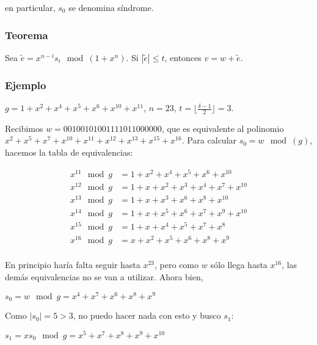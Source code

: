 \documentclass[10pt,a4paper]{article}
\begin{document}
en particular, $s_0$ se denomina síndrome.

\subsubsection*{Teorema}

Sea $\tilde{e} = x^{n-i}s_i \mod (1+x^n)$. Si $|\tilde{e}|\leq t$, entonces $v = w+ \tilde{e}$.

\subsubsection*{Ejemplo}

$g = 1 + x^2 + x^4 + x^5 + x^6 + x^{10} + x^{11}$, $n = 23$, $t = \lfloor \frac{\delta - 1}{2} \rfloor= 3$.

Recibimos $w = 0 0 1 0 0 1 0 1 0 0 1 1 1 1 0 1 1 0 0 0 0 0 0$, que es equivalente al polinomio $x^2+x^5+x^7+x^{10}+x^{11}+x^{12} + x^{13} + x^{15} + x^{16}$. Para calcular $s_0 = w \mod (g)$, hacemos la tabla de equivalencias:

\begin{center}
\begin{align*} x^{11} \mod g &= 1 + x^2 + x^4 + x^5 + x^6 + x^{10}\\ x^{12} \mod g &= 1+x+x^2+x^3+x^4+x^7+x^{10}\\ x^{13} \mod g &= 1 + x + x^3 + x^6 +x^{8}+x^{10}\\ x^{14} \mod g &= 1 + x +x^{5}+x^{ 6}+x^{ 7}+x^{ 9}+x^{ 10}\\ x^{15} \mod g &= 1 + x+x^{ 4}+x^{ 5}+x^{ 7}+x^{ 8}\\ x^{16} \mod g &= x +x^{2}+x^{ 5}+x^{ 6}+x^{ 8}+x^{ 9}\\ \end{align*}
\end{center}

En principio haría falta seguir hasta $x^{23}$, pero como $w$ sólo llega hasta $x^{16}$, las demás equivalencias no se van a utilizar. Ahora bien,

\begin{center}
$s_0 = w \mod g = x^{4}+x^{ 7}+x^{ 6}+x^{ 8}+x^{ 9}$
\end{center}

Como $|s_0| = 5 > 3$, no puedo hacer nada con esto y busco $s_1$:

\begin{center}
$s_1 = x s_0 \mod g= x^{5}+x^{ 7}+x^{ 8}+x^{ 9}+x^{ 10}$
\end{center}
\end{document}

